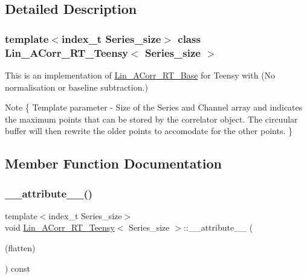 \subsection{Detailed Description}
\subsubsection*{template$<$index\+\_\+t Series\+\_\+size$>$\newline
class Lin\+\_\+\+A\+Corr\+\_\+\+R\+T\+\_\+\+Teensy$<$ Series\+\_\+size $>$}

This is an implementation of \hyperlink{classLin__ACorr__RT__Base}{Lin\+\_\+\+A\+Corr\+\_\+\+R\+T\+\_\+\+Base} for Teensy with {\bfseries }(No normalisation or baseline subtraction.) 

\begin{DoxyNote}{Note}
\{ Template parameter -\/ Size of the Series and Channel array and indicates the maximum points that can be stored by the correlator object. The circuular buffer will then rewrite the older points to accomodate for the other points. \} 
\end{DoxyNote}


\subsection{Member Function Documentation}
\mbox{\label{classLin__ACorr__RT__Teensy_a0bfee7278e28c759cca2497749aeecf7}} 
\subsubsection{\texorpdfstring{\+\_\+\+\_\+attribute\+\_\+\+\_\+()}{\_\_attribute\_\_()}}
{\footnotesize\ttfamily template$<$index\+\_\+t Series\+\_\+size$>$ \\
void \hyperlink{classLin__ACorr__RT__Teensy}{Lin\+\_\+\+A\+Corr\+\_\+\+R\+T\+\_\+\+Teensy}$<$ Series\+\_\+size $>$\+::\+\_\+\+\_\+attribute\+\_\+\+\_\+ (\begin{DoxyParamCaption}\item[{(flatten)}]{ }\end{DoxyParamCaption}) const}

